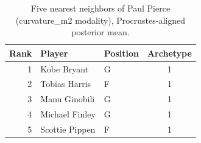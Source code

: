 \begin{table}[htbp]
  \centering\small
  \begin{tabular}{rllc}
    \toprule
    Rank & Player & Position & Archetype \\
    \midrule
    1 & Kobe Bryant & G & 1 \\
    2 & Tobias Harris & F & 1 \\
    3 & Manu Ginobili & G & 1 \\
    4 & Michael Finley & G & 1 \\
    5 & Scottie Pippen & F & 1 \\
    \bottomrule
  \end{tabular}
  \caption{Five nearest neighbors of Paul Pierce (curvature_m2 modality), Procrustes-aligned posterior mean.}
  \label{tab:Paul_Pierce_neighbors_curvature_m2}
\end{table}

